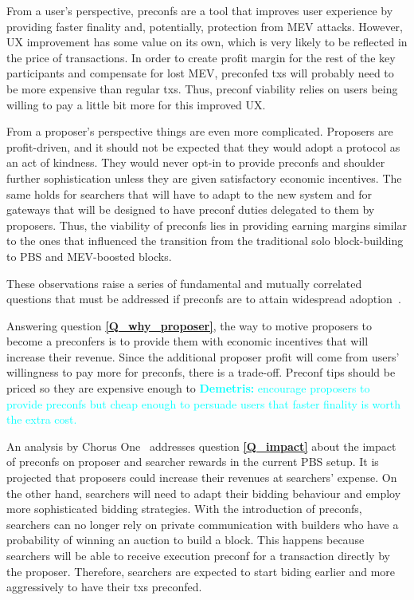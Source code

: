 \documentclass[a4paper]{article}
\theoremstyle{boldstyle}
\newcommand{\dk}[1]{\textcolor{cyan}{\textbf{Demetris:} #1}}
\begin{document}
    From a user's perspective, preconfs are a tool that improves user experience by providing faster finality and, potentially, protection from MEV attacks. However, UX improvement has some value on its own, which is very likely to be reflected in the price of transactions. In order to create profit margin for the rest of the key participants and compensate for lost MEV, preconfed txs will probably need to be more expensive than regular txs. Thus, preconf viability relies on users being willing to pay a little bit more for this improved UX. 

    From a proposer's perspective things are even more complicated. Proposers are profit-driven, and it should not be expected that they would adopt a protocol as an act of kindness. They would never opt-in to provide preconfs and shoulder further sophistication unless they are given satisfactory economic incentives. The same holds for searchers that will have to adapt to the new system and for gateways that will be designed to have preconf duties delegated to them by proposers. Thus, the viability of preconfs lies in providing earning margins similar to the ones that influenced the transition from the traditional solo block-building to PBS and MEV-boosted blocks.

    These observations raise a series of fundamental and mutually correlated questions that must be addressed if preconfs are to attain widespread adoption~\cite{W:EconomicViabilityofPreconfirmations}. 

    
    Answering question \textbf{\ref{Q_why_proposer}}, the way to motive proposers to become a preconfers is to provide them with economic incentives that will increase their revenue. Since the additional proposer profit will come from users' willingness to pay more for preconfs, there is a trade-off. Preconf tips should be priced so they are expensive enough to \dk{encourage proposers to provide preconfs but cheap enough to persuade users that faster finality is worth the extra cost.   }
 
    An analysis by Chorus One~\cite{W:PreconfirmationsundertheNOlens} addresses question \textbf{\ref{Q_impact}} about the impact of preconfs on proposer and searcher rewards in the current PBS setup. It is projected that proposers could increase their revenues at searchers' expense. On the other hand, searchers will need to adapt their bidding behaviour and employ more sophisticated bidding strategies. With the introduction of preconfs, searchers can no longer rely on private communication with builders who have a probability of winning an auction to build a block. This happens because searchers will be able to receive execution preconf for a transaction directly by the proposer. Therefore, searchers are expected to start biding earlier and more aggressively to have their txs preconfed.
\end{document}
